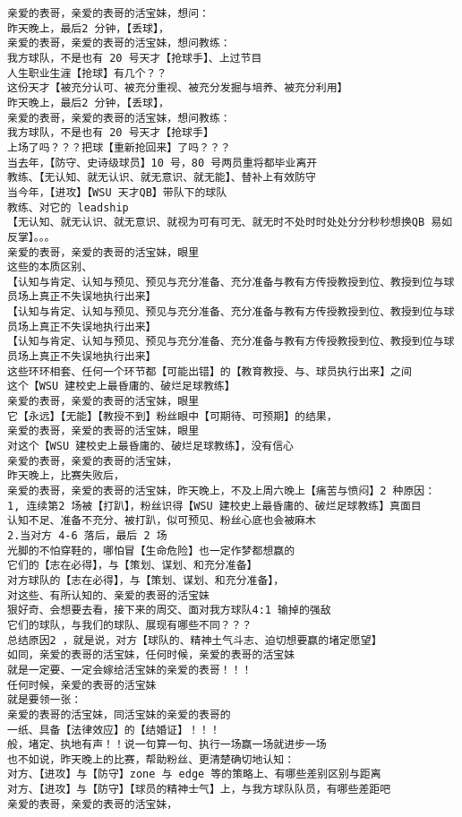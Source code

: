 \documentclass[9pt, b5paper]{article}
\begin{document}
\begin{verbatim}
亲爱的表哥，亲爱的表哥的活宝妹，想问：
昨天晚上，最后2 分钟，【丢球】，
亲爱的表哥，亲爱的表哥的活宝妹，想问教练：
我方球队，不是也有 20 号天才【抢球手】、上过节目
人生职业生漄【抢球】有几个？？
这份天才【被充分认可、被充分重视、被充分发掘与培养、被充分利用】
昨天晚上，最后2 分钟，【丢球】，
亲爱的表哥，亲爱的表哥的活宝妹，想问教练：
我方球队，不是也有 20 号天才【抢球手】
上场了吗？？？把球【重新抢回来】了吗？？？
当去年，【防守、史诗级球员】10 号，80 号两员重将都毕业离开
教练、【无认知、就无认识、就无意识、就无能】、替补上有效防守
当今年，【进攻】【WSU 天才QB】带队下的球队
教练、对它的 leadship
【无认知、就无认识、就无意识、就视为可有可无、就无时不处时时处处分分秒秒想换QB 易如反掌】。。。
亲爱的表哥，亲爱的表哥的活宝妹，眼里
这些的本质区别、
【认知与肯定、认知与预见、预见与充分准备、充分准备与教有方传授教授到位、教授到位与球员场上真正不失误地执行出来】
【认知与肯定、认知与预见、预见与充分准备、充分准备与教有方传授教授到位、教授到位与球员场上真正不失误地执行出来】
【认知与肯定、认知与预见、预见与充分准备、充分准备与教有方传授教授到位、教授到位与球员场上真正不失误地执行出来】
这些环环相套、任何一个环节都【可能出错】的【教育教授、与、球员执行出来】之间
这个【WSU 建校史上最昏庸的、破烂足球教练】
亲爱的表哥，亲爱的表哥的活宝妹，眼里
它【永远】【无能】【教授不到】粉丝眼中【可期待、可预期】的结果，
亲爱的表哥，亲爱的表哥的活宝妹，眼里
对这个【WSU 建校史上最昏庸的、破烂足球教练】，没有信心
亲爱的表哥，亲爱的表哥的活宝妹，
昨天晚上，比赛失败后，
亲爱的表哥，亲爱的表哥的活宝妹，昨天晚上，不及上周六晚上【痛苦与愤闷】2 种原因：
1, 连续第2 场被【打趴】，粉丝识得【WSU 建校史上最昏庸的、破烂足球教练】真面目
认知不足、准备不充分、被打趴，似可预见、粉丝心底也会被麻木
2.当对方 4-6 落后，最后 2 场
光脚的不怕穿鞋的，哪怕冒【生命危险】也一定作梦都想赢的
它们的【志在必得】，与【策划、谋划、和充分准备】
对方球队的【志在必得】，与【策划、谋划、和充分准备】，
对这些、有所认知的、亲爱的表哥的活宝妹 
狠好奇、会想要去看，接下来的周交、面对我方球队4:1 输掉的强敌
它们的球队，与我们的球队、展现有哪些不同？？？
总结原因2 ，就是说，对方【球队的、精神土气斗志、迫切想要赢的堵定愿望】
如同，亲爱的表哥的活宝妹，任何时候，亲爱的表哥的活宝妹 
就是一定要、一定会嫁给活宝妹的亲爱的表哥！！！
任何时候，亲爱的表哥的活宝妹 
就是要领一张：
亲爱的表哥的活宝妹，同活宝妹的亲爱的表哥的
一纸、具备【法律效应】的【结婚证】！！！
般，堵定、执地有声！！说一句算一句、执行一场赢一场就进步一场
也不如说，昨天晚上的比赛，帮助粉丝、更清楚确切地认知：
对方、【进攻】与【防守】zone 与 edge 等的策略上、有哪些差别区别与距离 
对方、【进攻】与【防守】【球员的精神士气】上，与我方球队队员，有哪些差距吧
亲爱的表哥，亲爱的表哥的活宝妹，

\end{verbatim}
\end{document}
